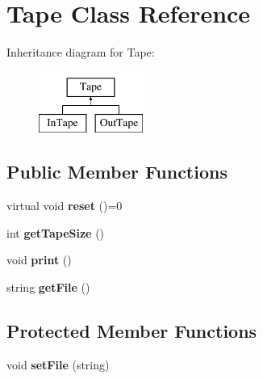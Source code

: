 \hypertarget{classTape}{\section{Tape Class Reference}
\label{classTape}
}
Inheritance diagram for Tape\-:\begin{figure}[H]
\begin{center}
\leavevmode
\includegraphics[height=2.000000cm]{classTape}
\end{center}
\end{figure}
\subsection*{Public Member Functions}
\begin{DoxyCompactItemize}
\item 
\hypertarget{classTape_a5f06dea26c7e30c323613f52b5edea62}{virtual void {\bfseries reset} ()=0}\label{classTape_a5f06dea26c7e30c323613f52b5edea62}

\item 
\hypertarget{classTape_a90be518f537d4210cee05b716feede36}{int {\bfseries get\-Tape\-Size} ()}\label{classTape_a90be518f537d4210cee05b716feede36}

\item 
\hypertarget{classTape_a2906a5dbf3c52729b0ae5a336c3828b6}{void {\bfseries print} ()}\label{classTape_a2906a5dbf3c52729b0ae5a336c3828b6}

\item 
\hypertarget{classTape_ac57754a7bdde56b9509a9a992b833e97}{string {\bfseries get\-File} ()}\label{classTape_ac57754a7bdde56b9509a9a992b833e97}

\end{DoxyCompactItemize}
\subsection*{Protected Member Functions}
\begin{DoxyCompactItemize}
\item 
\hypertarget{classTape_a0a6f4c9427e679f2ff77b4c0c2792429}{void {\bfseries set\-File} (string)}\label{classTape_a0a6f4c9427e679f2ff77b4c0c2792429}

\end{DoxyCompactItemize}
